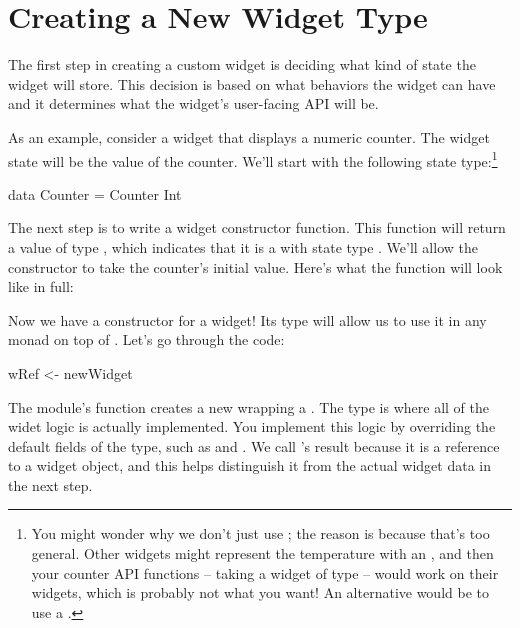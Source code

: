 \section{Creating a New Widget Type}
\label{sec:new_widget_type}

The first step in creating a custom widget is deciding what kind of
state the widget will store.  This decision is based on what behaviors
the widget can have and it determines what the widget's user-facing
API will be.

As an example, consider a widget that displays a numeric counter.  The
widget state will be the value of the counter.  We'll start with the
following state type:\footnote{You might wonder why we don't just use
  ; the reason is because that's too general.  Other widgets
  might represent the temperature with an , and then your
  counter API functions -- taking a widget of type  --
  would work on their widgets, which is probably not what you want!
  An alternative would be to use a .}

\begin{haskellcode}
 data Counter = Counter Int
\end{haskellcode}

The next step is to write a widget constructor function.  This
function will return a value of type , which
indicates that it is a  with state type .
We'll allow the constructor to take the counter's initial value.
Here's what the function will look like in full:


Now we have a constructor for a  widget!  Its type will
allow us to use it in any monad on top of .  Let's go through
the code:

\begin{haskellcode}
 wRef <- newWidget
\end{haskellcode}

The  module's  function creates a new
 wrapping a .  The  type is
where all of the widet logic is actually implemented.  You implement
this logic by overriding the default fields of the 
type, such as  and .  We call 's
result  because it is a reference to a widget object, and
this helps distinguish it from the actual widget data in the next
step.


